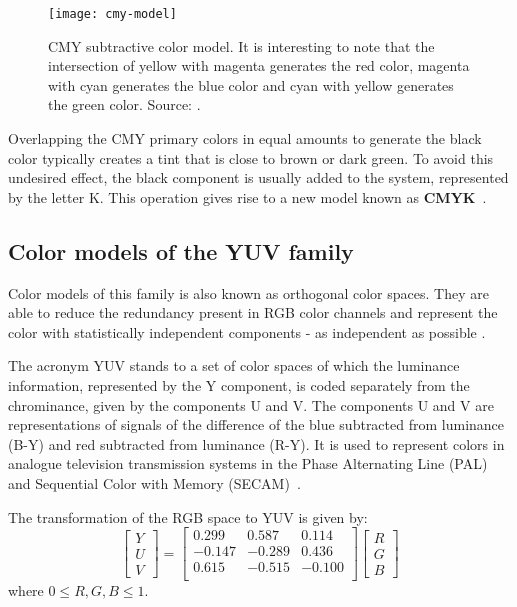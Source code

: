 \begin{figure}[!h]
  \centering
  \texttt{[image: cmy-model]}
  \caption[CMY subtractive color model]{CMY subtractive color model. It is interesting to note that the intersection of yellow with magenta generates the red color, magenta with cyan generates the blue color and cyan with yellow generates the green color. Source: \citet{rus:08}.}
  \label{fig:cmy-model}
\end{figure}

Overlapping the CMY primary colors in equal amounts to generate the black color typically creates a tint that is close to brown or dark green. To avoid this undesired effect, the black component is usually added to the system, represented by the letter K. This operation gives rise to a new model known as \textbf{CMYK}~\citep{gonzalez:02}.

\subsection{Color models of the YUV family}
\label{sec:modelo_cores_yuv}

Color models of this family is also known as orthogonal color spaces. They are able to reduce the redundancy present in RGB color channels and represent the color with statistically independent components - as independent as possible \citep{kakumanu:07}.

The acronym YUV stands to a set of color spaces of which the luminance information, represented by the Y component, is coded separately from the chrominance, given by the components U and V. The components U and V are representations of signals of the difference of the blue subtracted from luminance (B-Y) and red subtracted from luminance (R-Y). It is used to represent colors in analogue television transmission systems in the Phase Alternating Line (PAL) and Sequential Color with Memory (SECAM)~\citep{pedrini:08}.

The transformation of the RGB space to YUV is given by:\\
\begin{equation}
  \begin{bmatrix}
    Y \\ U \\ V
  \end{bmatrix} = 
  \begin{bmatrix}
     0.299 &  0.587 &  0.114 \\
    -0.147 & -0.289 &  0.436 \\
     0.615 & -0.515 & -0.100 \\
  \end{bmatrix}
  \begin{bmatrix}
    R \\ G \\ B
  \end{bmatrix}
\end{equation}
where $0 \leq R, G, B \leq 1$.


